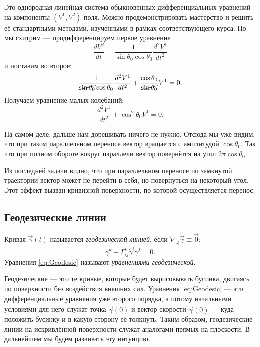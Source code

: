 \begin{solution}
	Это однородная линейная система обыкновенных дифференциальных уравнений на компоненты $(V^1, V^2)$ поля. Можно продемонстрировать мастерство и решить её стандартными методами, изученными в рамках соответствующего курса. Но мы схитрим --- продифференцируем первое уравнение
	\[
		\frac{dV^2}{dt} = \frac{1}{\sin\theta_0\cos\theta_0}\frac{d^2V^1}{dt^2}
	\]
	и поставим во второе:
	\[
		\frac{1}{\cancel{\sin\theta_0}\cos\theta_0}\frac{d^2V^1}{dt^2} + \frac{\cos\theta_0}{\cancel{\sin\theta_0}}V^1 = 0.
	\]
	Получаем уравнение малых колебаний:
	\[
		\frac{d^2V^1}{dt^2} + \cos^2\theta_0V^1 = 0.
	\]

	На самом деле, дальше нам дорешивать ничего не нужно. Отсюда мы уже видим, что при таком параллельном переносе вектор вращается с амплитудой $\cos\theta_0$. Так что при полном обороте вокруг параллели вектор повернётся на угол $2\pi\cos\theta_0$.
\end{solution}

Из последней задачи видно, что при параллельном переносе по замкнутой траектории вектор может не перейти в себя, но повернуться на некоторый угол. Этот эффект вызван кривизной поверхности, по которой осуществляется перенос.


\subsection{Геодезические линии}

\begin{definition}
	Кривая $\vec{\gamma}(t)$ называется \textit{геодезической линией}, если $\nabla_{\dot{\vec{\gamma}}}\dot{\vec{\gamma}} \equiv \vec{0}$:
	\begin{equation} \label{eq:Geodesic}
		\ddot{\gamma}^k + \Gamma_{ij}^k\dot{\gamma}^i\dot\gamma^j = 0.
	\end{equation}
	Уравнения \eqref{eq:Geodesic} называют \textit{уравнениями геодезической}.
\end{definition}

Геодезические --- это те кривые, которые будет вырисовывать бусинка, двигаясь по поверхности без воздействия внешних сил. Уравнения \eqref{eq:Geodesic} --- это дифференциальные уравнения уже \underline{второго} порядка, а потому начальными условиями для него служат точка $\vec{\gamma}(0)$ и вектор скорости $\dot{\vec{\gamma}}(0)$ --- куда положить бусинку и в какую сторону её толкнуть. Таким образом, геодезические линии на искривлённой поверхности служат аналогами прямых на плоскости. В дальнейшем мы будем развивать эту интуицию.


